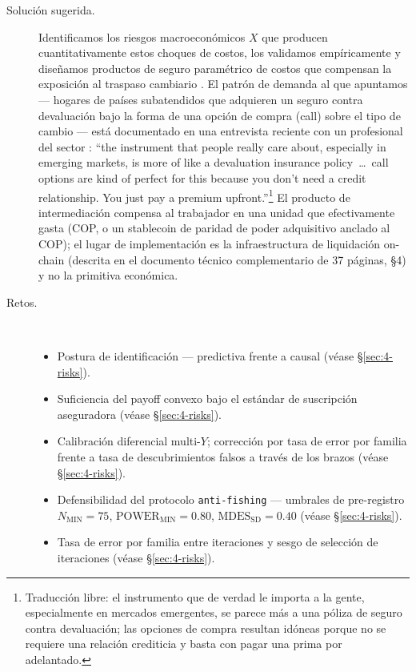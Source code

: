 \documentclass[11pt,a4paper]{article}
\theoremstyle{plain}
\begin{document}
\begin{description}
  \item[Solución sugerida.] Identificamos los riesgos macroeconómicos \(X\) que producen cuantitativamente estos choques de costos, los validamos empíricamente y diseñamos productos de seguro paramétrico de costos que compensan la exposición al traspaso cambiario \citep{carter_etal_2017,mahul_stutley_2010,clarke_2016}. El patrón de demanda al que apuntamos --- hogares de países subatendidos que adquieren un seguro contra devaluación bajo la forma de una opción de compra (call) sobre el tipo de cambio --- está documentado en una entrevista reciente con un profesional del sector \citep{depreciation_insurance_talk}: ``the instrument that people really care about, especially in emerging markets, is more of like a devaluation insurance policy~\ldots~call options are kind of perfect for this because you don't need a credit relationship. You just pay a premium upfront.''\footnote{Traducción libre: el instrumento que de verdad le importa a la gente, especialmente en mercados emergentes, se parece más a una póliza de seguro contra devaluación; las opciones de compra resultan idóneas porque no se requiere una relación crediticia y basta con pagar una prima por adelantado.} El producto de intermediación compensa al trabajador en una unidad que efectivamente gasta (COP, o un stablecoin de paridad de poder adquisitivo anclado al COP); el lugar de implementación es la infraestructura de liquidación on-chain (descrita en el documento técnico complementario de 37 páginas, \S4) y no la primitiva económica.
  \item[Retos.]\hfill\\
  \begin{itemize}
    \item Postura de identificación --- predictiva frente a causal (véase \S\ref{sec:4-risks}).
    \item Suficiencia del payoff convexo bajo el estándar de suscripción aseguradora (véase \S\ref{sec:4-risks}).
    \item Calibración diferencial multi-\(Y\); corrección por tasa de error por familia frente a tasa de descubrimientos falsos a través de los brazos (véase \S\ref{sec:4-risks}).
    \item Defensibilidad del protocolo \texttt{anti-fishing} --- umbrales de pre-registro \(N_{\mathrm{MIN}}=75\), \(\mathrm{POWER}_{\mathrm{MIN}}=0.80\), \(\mathrm{MDES}_{\mathrm{SD}}=0.40\) (véase \S\ref{sec:4-risks}).
    \item Tasa de error por familia entre iteraciones y sesgo de selección de iteraciones (véase \S\ref{sec:4-risks}).

\end{itemize}
\end{description}
\end{document}
